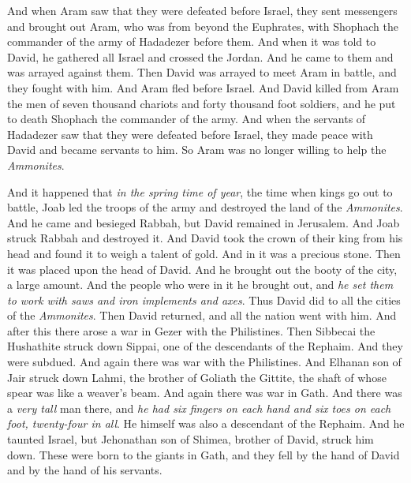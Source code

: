 \begin{biblechapter}
\verse And when Aram saw that they were defeated before Israel, they sent messengers and brought out Aram, who was from beyond the Euphrates, with Shophach the commander of the army of Hadadezer before them.
\verse And when it was told to David, he gathered all Israel and crossed the Jordan. And he came to them and was arrayed against them. Then David was arrayed to meet Aram in battle, and they fought with him.
\verse And Aram fled before Israel. And David killed from Aram the men of seven thousand chariots and forty thousand foot soldiers, and he put to death Shophach the commander of the army.
\verse And when the servants of Hadadezer saw that they were defeated before Israel, they made peace with David and became servants to him. So Aram was no longer willing to help the \textit{Ammonites}.
\end{biblechapter}

\begin{biblechapter} %
 And it happened that \textit{in the spring time of year}, the time when kings go out to battle, Joab led the troops of the army and destroyed the land of the \textit{Ammonites}. And he came and besieged Rabbah, but David remained in Jerusalem. And Joab struck Rabbah and destroyed it.
\verse And David took the crown of their king from his head and found it to weigh a talent of gold. And in it was a precious stone. Then it was placed upon the head of David. And he brought out the booty of the city, a large amount.
\verse And the people who were in it he brought out, and \textit{he set them to work with saws and iron implements and axes}. Thus David did to all the cities of the \textit{Ammonites}. Then David returned, and all the nation went with him.
 And after this there arose a war in Gezer with the Philistines. Then Sibbecai the Hushathite struck down Sippai, one of the descendants of the Rephaim. And they were subdued.
\verse And again there was war with the Philistines. And Elhanan son of Jair struck down Lahmi, the brother of Goliath the Gittite, the shaft of whose spear was like a weaver’s beam.
\verse And again there was war in Gath. And there was a \textit{very tall} man there, and \textit{he had six fingers on each hand and six toes on each foot, twenty-four in all}. He himself was also a descendant of the Rephaim.
\verse And he taunted Israel, but Jehonathan son of Shimea, brother of David, struck him down.
\verse These were born to the giants in Gath, and they fell by the hand of David and by the hand of his servants.
\end{biblechapter}


